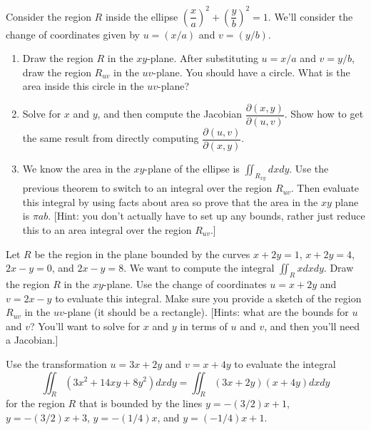\begin{problem}
 Consider the region $R$ inside the ellipse $\left(\dfrac{x}{a}\right)^2+\left(\dfrac{y}{b}\right)^2=1$.  We'll consider the change of coordinates given by $u=(x/a)$ and $v=(y/b)$.
\begin{enumerate}
 \item Draw the region $R$ in the $xy$-plane.  After substituting $u=x/a$ and $v=y/b$, draw the region $R_{uv}$ in the $uv$-plane.  You should have a circle.  What is the area inside this circle in the $uv$-plane?
 \item Solve for $x$ and $y$, and then compute the Jacobian  $\dfrac{\partial (x,y)}{\partial (u,v)}$. Show how to get the same result from directly computing $\dfrac{\partial (u,v)}{\partial (x,y)}$.
 \item We know the area in the $xy$-plane of the ellipse is $\iint_{R_{xy}} dxdy$. Use the previous theorem to switch to an integral over the region $R_{uv}$.  Then evaluate this integral by using facts about area so prove that the area in the $xy$ plane is $\pi a b$. [Hint: you don't actually have to set up any bounds, rather just reduce this to an area integral over the region $R_{uv}$.] 
\end{enumerate}

\end{problem}


\begin{problem}
Let $R$ be the region in the plane bounded by the curves $x+2y=1$, $x+2y=4$, $2x-y=0$, and $2x-y=8$.  We want to compute the integral $\iint_R xdxdy$. Draw the region $R$ in the $xy$-plane. Use the change of coordinates $u=x+2y$ and $v=2x-y$ to evaluate this integral. Make sure you provide a sketch of the region $R_{uv}$ in the $uv$-plane (it should be a rectangle).  
[Hints: what are the bounds for $u$ and $v$?  You'll want to solve for $x$ and $y$ in terms of $u$ and $v$, and then you'll need a Jacobian.]
\end{problem}


\begin{problem}
 Use the transformation $u=3x+2y$ and $v=x+4y$ to evaluate the integral $$\iint_R (3x^2+14xy+8y^2)dxdy =\iint_R (3x+2y)(x+4y)dxdy $$ for the region $R$ that is bounded by the lines $y=-(3/2)x+1$, $y=-(3/2)x+3$, $y=-(1/4)x$, and  $y=(-1/4)x+1$.
\end{problem}

